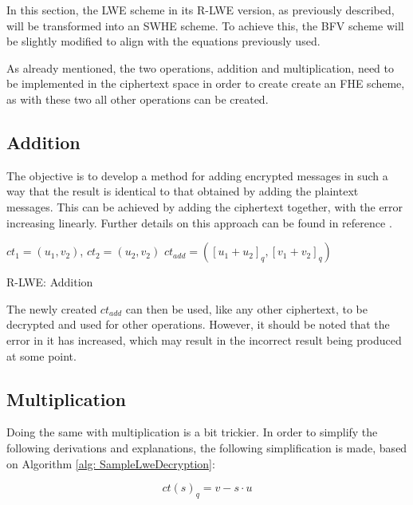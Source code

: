 In this section, the LWE scheme in its R-LWE version, as previously described, will be transformed into an SWHE scheme. To achieve this, the BFV scheme \cite{bfv} will be slightly modified to align with the equations previously used.

As already mentioned, the two operations, addition and multiplication, need to be implemented in the ciphertext space in order to create create an FHE scheme, as with these two all other operations can be created.

\subsection*{Addition}

The objective is to develop a method for adding encrypted messages in such a way that the result is identical to that obtained by adding the plaintext messages. This can be achieved by adding the ciphertext together, with the error increasing linearly. Further details on this approach can be found in reference \cite{bfv}. 

\begin{algorithm}[htb]
  \begin{algorithmic}[1]
    \REQUIRE $ct_1 = (u_1, v_2)$, $ct_2 = (u_2, v_2)$
    \RETURN $ct_{add} = ([u_1 + u_2]_q, [v_1 + v_2]_q)$
  \end{algorithmic}
  \caption{R-LWE: Addition}
  \label{alg:RlweAddition}
\end{algorithm}

The newly created $ct_{add}$ can then be used, like any other ciphertext, to be decrypted and used for other operations. However, it should be noted that the error in it has increased, which may result in the incorrect result being produced at some point.

\subsection*{Multiplication}

Doing the same with multiplication is a bit trickier. In order to simplify the following derivations and explanations, the following simplification is made, based on Algorithm \ref{alg: SampleLweDecryption}:

\begin{equation}
  ct(s)_q = v-s\cdot u
  \label{eq:baseCt}
\end{equation}

